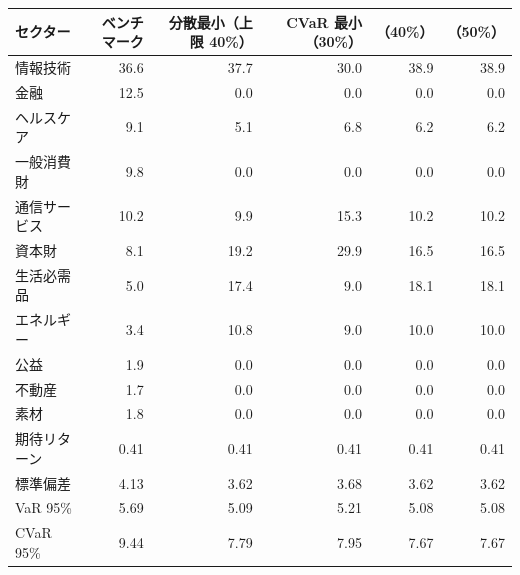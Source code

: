 \begin{tabular}{lrrrrr}
\toprule
セクター & ベンチマーク & 分散最小（上限 40\%） & CVaR 最小（30\%） & （40\%） & （50\%） \\
\midrule
情報技術 & 36.6 & 37.7 & 30.0 & 38.9 & 38.9 \\
金融 & 12.5 & 0.0 & 0.0 & 0.0 & 0.0 \\
ヘルスケア & 9.1 & 5.1 & 6.8 & 6.2 & 6.2 \\
一般消費財 & 9.8 & 0.0 & 0.0 & 0.0 & 0.0 \\
通信サービス & 10.2 & 9.9 & 15.3 & 10.2 & 10.2 \\
資本財 & 8.1 & 19.2 & 29.9 & 16.5 & 16.5 \\
生活必需品 & 5.0 & 17.4 & 9.0 & 18.1 & 18.1 \\
エネルギー & 3.4 & 10.8 & 9.0 & 10.0 & 10.0 \\
公益 & 1.9 & 0.0 & 0.0 & 0.0 & 0.0 \\
不動産 & 1.7 & 0.0 & 0.0 & 0.0 & 0.0 \\
素材 & 1.8 & 0.0 & 0.0 & 0.0 & 0.0 \\
\midrule
期待リターン & 0.41 & 0.41 & 0.41 & 0.41 & 0.41 \\
標準偏差 & 4.13 & 3.62 & 3.68 & 3.62 & 3.62 \\
VaR 95\% & 5.69 & 5.09 & 5.21 & 5.08 & 5.08 \\
CVaR 95\% & 9.44 & 7.79 & 7.95 & 7.67 & 7.67 \\
\bottomrule
\end{tabular}
